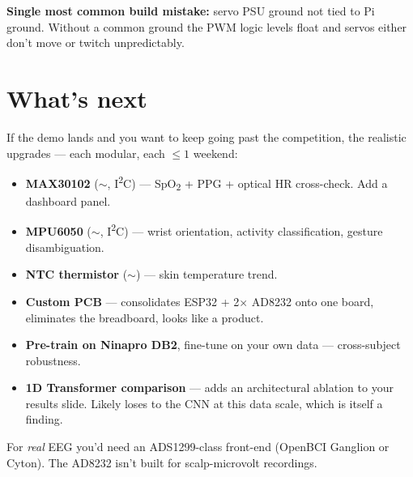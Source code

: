 \documentclass[10pt, a4paper]{article}
\begin{document}
\begin{warningbox}
\textbf{Single most common build mistake:} servo PSU ground not tied to Pi ground. Without a common ground the PWM logic levels float and servos either don't move or twitch unpredictably.
\end{warningbox}

\section*{What's next}

If the demo lands and you want to keep going past the competition, the realistic upgrades --- each modular, each $\leq 1$ weekend:

\begin{itemize}
  \item \textbf{MAX30102} ($\sim$, I\textsuperscript{2}C) --- SpO\textsubscript{2} + PPG + optical HR cross-check. Add a dashboard panel.
  \item \textbf{MPU6050} ($\sim$, I\textsuperscript{2}C) --- wrist orientation, activity classification, gesture disambiguation.
  \item \textbf{NTC thermistor} ($\sim$) --- skin temperature trend.
  \item \textbf{Custom PCB} --- consolidates ESP32 + 2$\times$ AD8232 onto one board, eliminates the breadboard, looks like a product.
  \item \textbf{Pre-train on Ninapro DB2}, fine-tune on your own data --- cross-subject robustness.
  \item \textbf{1D Transformer comparison} --- adds an architectural ablation to your results slide. Likely loses to the CNN at this data scale, which is itself a finding.
\end{itemize}

For \emph{real} EEG you'd need an ADS1299-class front-end (OpenBCI Ganglion or Cyton). The AD8232 isn't built for scalp-microvolt recordings.
\end{document}
